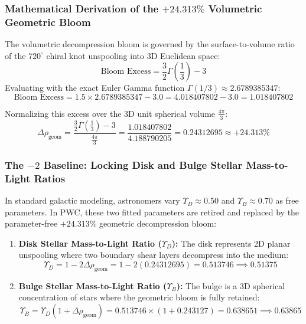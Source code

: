 \documentclass[11pt,a4paper]{article}
\begin{document}
\subsubsection{Mathematical Derivation of the $+24.313\%$ Volumetric Geometric Bloom}
\label{subsubsec:bloom_derivation}

The volumetric decompression bloom is governed by the surface-to-volume ratio of the $720^\circ$ chiral knot unspooling into 3D Euclidean space:
\begin{equation}
\text{Bloom Excess} = \frac{3}{2}\Gamma\left(\frac{1}{3}\right) - 3
\end{equation}
Evaluating with the exact Euler Gamma function $\Gamma(1/3) \approx 2.6789385347$:
\begin{equation}
\text{Bloom Excess} = 1.5 \times 2.6789385347 - 3.0 = 4.018407802 - 3.0 = \mathbf{1.018407802}
\end{equation}

Normalizing this excess over the 3D unit spherical volume $\frac{4\pi}{3}$:
\begin{equation}
\Delta\rho_{\text{geom}} = \frac{\frac{3}{2}\Gamma\left(\frac{1}{3}\right) - 3}{\frac{4\pi}{3}} = \frac{1.018407802}{4.188790205} = \mathbf{0.24312695} \approx \mathbf{+24.313\%}
\label{eq:delta_rho_geom}
\end{equation}

\subsubsection{The $-2$ Baseline: Locking Disk and Bulge Stellar Mass-to-Light Ratios}
\label{subsubsec:upsilon_locked}

In standard galactic modeling, astronomers vary $\Upsilon_D \approx 0.50$ and $\Upsilon_B \approx 0.70$ as free parameters. In PWC, these two fitted parameters are retired and replaced by the parameter-free $+24.313\%$ geometric decompression bloom:

\begin{enumerate}
    \item \textbf{Disk Stellar Mass-to-Light Ratio ($\Upsilon_D$):}  
    The disk represents 2D planar unspooling where two boundary shear layers decompress into the medium:
    \begin{equation}
    \Upsilon_D = 1 - 2\Delta\rho_{\text{geom}} = 1 - 2(0.24312695) = \mathbf{0.513746} \implies \mathbf{0.51375}
    \label{eq:upsilon_d}
    \end{equation}

    \item \textbf{Bulge Stellar Mass-to-Light Ratio ($\Upsilon_B$):}  
    The bulge is a 3D spherical concentration of stars where the geometric bloom is fully retained:
    \begin{equation}
    \Upsilon_B = \Upsilon_D(1 + \Delta\rho_{\text{geom}}) = 0.513746 \times (1 + 0.243127) = \mathbf{0.638651} \implies \mathbf{0.63865}
    \label{eq:upsilon_b}
    \end{equation}
\end{enumerate}
\end{document}
